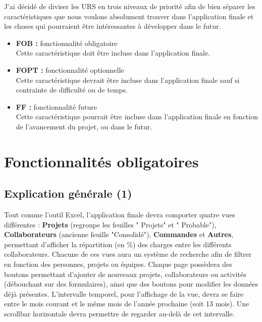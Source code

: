 \documentclass[french]{report}
\begin{document}
J'ai décidé de diviser les URS en trois niveaux de priorité afin de bien séparer
les caractéristiques que nous voulons absolument trouver dans l'application finale
et les choses qui pourraient être intéressantes à développer dans le futur.\\
\begin{itemize}[label=\textbullet, font=\normalfont \color{blue}]
  \item{\textbf{FOB : }} fonctionnalité obligatoire\\
  Cette caractéristique doit être incluse dans l'application finale.
  \item{\textbf{FOPT : }} fonctionnalité optionnelle\\
  Cette caractéristique devrait être incluse dans l'application finale sauf si
  contrainte de difficulté ou de temps.
  \item{\textbf{FF : }} fonctionnalité future\\
  Cette caractéristique pourrait être incluse dans l'application finale en
  fonction de l'avancement du projet, ou dans le futur.
\end{itemize}

\vspace{0.5cm}

  \section{Fonctionnalités obligatoires}
\subsection{Explication générale (1)}

Tout comme l’outil Excel, l’application finale devra comporter quatre vues
différentes : \textbf{Projets} (regroupe les feuilles " Projets" et "
Probable"), \textbf{Collaborateurs} (ancienne feuille "Consolidé"),
\textbf{Commandes} et \textbf{Autres}, permettant d’afficher la
répartition (en \%) des charges entre les différents collaborateurs. Chacune de
ces vues aura un système de recherche afin de filtrer en fonction des personnes,
projets ou équipes. Chaque page possèdera des boutons permettant d’ajouter de
nouveaux projets, collaborateurs ou activités (débouchant sur des formulaires),
ainsi que des boutons pour modifier les données déjà présentes. L’intervalle
temporel, pour l’affichage de la vue, devra se faire entre le mois courant et le
même mois de l’année prochaine (soit 13 mois). Une scrollbar horizontale devra
permettre de regarder au-delà de cet intervalle.
\end{document}
